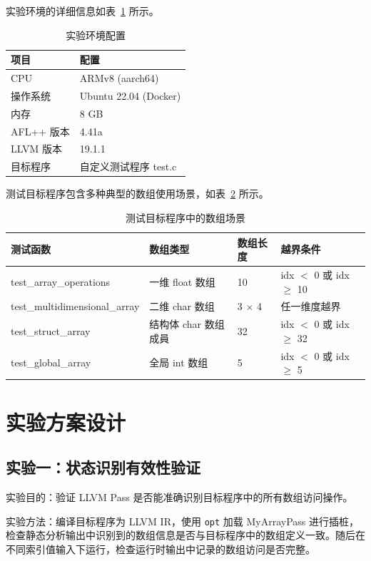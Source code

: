 \documentclass[bachelor]{njupthesis}
\begin{document}
实验环境的详细信息如表~\ref{tab:env} 所示。

\begin{table}[hbt]
\centering
\caption{实验环境配置}
\label{tab:env}
\begin{tabular}{|l|l|}
\hline
\textbf{项目} & \textbf{配置} \\
\hline
CPU & ARMv8 (aarch64) \\
操作系统 & Ubuntu 22.04 (Docker) \\
内存 & 8 GB \\
AFL++ 版本 & 4.41a \\
LLVM 版本 & 19.1.1 \\
目标程序 & 自定义测试程序 test.c \\
\hline
\end{tabular}
\end{table}

测试目标程序包含多种典型的数组使用场景，如表~\ref{tab:target} 所示。

\begin{table}[hbt]
\centering
\caption{测试目标程序中的数组场景}
\label{tab:target}
\begin{tabular}{|l|l|l|l|}
\hline
\textbf{测试函数} & \textbf{数组类型} & \textbf{数组长度} & \textbf{越界条件} \\
\hline
test\_array\_operations & 一维 float 数组 & 10 & idx $<$ 0 或 idx $\geq$ 10 \\
test\_multidimensional\_array & 二维 char 数组 & 3 $\times$ 4 & 任一维度越界 \\
test\_struct\_array & 结构体 char 数组成員 & 32 & idx $<$ 0 或 idx $\geq$ 32 \\
test\_global\_array & 全局 int 数组 & 5 & idx $<$ 0 或 idx $\geq$ 5 \\
\hline
\end{tabular}
\end{table}

\section{实验方案设计}

\subsection{实验一：状态识别有效性验证}

实验目的：验证 LLVM Pass 是否能准确识别目标程序中的所有数组访问操作。

实验方法：编译目标程序为 LLVM IR，使用 \texttt{opt} 加载 MyArrayPass 进行插桩，检查静态分析输出中识别到的数组信息是否与目标程序中的数组定义一致。随后在不同索引值输入下运行，检查运行时输出中记录的数组访问是否完整。
\end{document}
